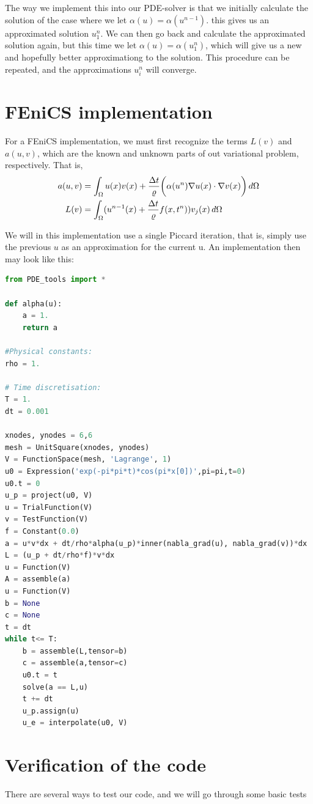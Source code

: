 \documentclass[12pt]{article}
\begin{document}
The way we implement this into our PDE-solver is that we initially calculate the solution of the case where we let $\alpha(u) = \alpha(u^{n-1})$. this gives us an approximated solution $u^n_1$. We can then go back and calculate the approximated solution again, but this time we let $\alpha(u) = \alpha(u^{n}_1)$, which will give us a new and hopefully better approximationg to the solution. This procedure can be repeated, and the approximations $u_i^{n}$ will converge.

\section{FEniCS implementation}
For a FEniCS implementation, we must first recognize the terms $L(v)$ and $a(u,v)$, which are the known and unknown parts of out variational problem, respectively. That is, 
\begin{align}
 a(u,v) & = \int_\Omega u(x)v(x) + {\Delta t \over \varrho}\bigg( \alpha(u^n) \nabla u(x)\cdot \nabla v(x) \bigg)\, d\Omega  \label{eq:a}\\
 L(v)& = \int_\Omega (u^{n-1}(x) + {\Delta t \over \varrho}f(x,t^n)) v_j(x) \, d\Omega \label{eq:L}
\end{align}

We will in this implementation use a single Piccard iteration, that is, simply use the previous $u$ as an approximation for the current u. An implementation then may look like this:
\begin{lstlisting}[language=Python]
 from PDE_tools import *

def alpha(u):
	a = 1.
	return a

#Physical constants:
rho = 1.

# Time discretisation:
T = 1.
dt = 0.001

xnodes, ynodes = 6,6
mesh = UnitSquare(xnodes, ynodes)
V = FunctionSpace(mesh, 'Lagrange', 1)
u0 = Expression('exp(-pi*pi*t)*cos(pi*x[0])',pi=pi,t=0)
u0.t = 0
u_p = project(u0, V)
u = TrialFunction(V)
v = TestFunction(V)
f = Constant(0.0)
a = u*v*dx + dt/rho*alpha(u_p)*inner(nabla_grad(u), nabla_grad(v))*dx
L = (u_p + dt/rho*f)*v*dx
u = Function(V)
A = assemble(a)
u = Function(V)
b = None
c = None
t = dt
while t<= T:
	b = assemble(L,tensor=b)
	c = assemble(a,tensor=c)
	u0.t = t
	solve(a == L,u)
	t += dt
	u_p.assign(u)
	u_e = interpolate(u0, V)
\end{lstlisting}

\section{Verification of the code}
There are several ways to test our code, and we will go through some basic tests
\end{document}
